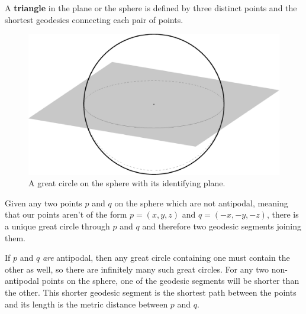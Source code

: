 \begin{definition}
	A \textbf{triangle} in the plane or the sphere is defined by three distinct points and the shortest geodesics connecting each pair of points.
\end{definition}






{
\ifsmallfigs
\else
\begin{figure}[htb]
	\centering
	\includegraphics[width=.5\textwidth]{figs/sph-1pl.pdf}
	\caption{A great circle on the sphere with its identifying plane.}
	\label{fig:sphereline}
\end{figure}
\fi
}



\begin{observation}
	Given any two points $p$ and $q$ on the sphere which are not antipodal, meaning that our points aren't of the form $p=(x,y,z)$ and $q=(-x,-y,-z)$, there is a unique great circle through $p$ and $q$ and therefore two geodesic segments joining them. 
\end{observation}
If $p$ and $q$ \textit{are} antipodal, then any great circle containing one must contain the other as well, so there are infinitely many such great circles. For any two non-antipodal points on the sphere, one of the geodesic segments will be shorter than the other.  {This shorter geodesic segment is the shortest path between the points and its length is the metric distance between $p$ and $q$}.

